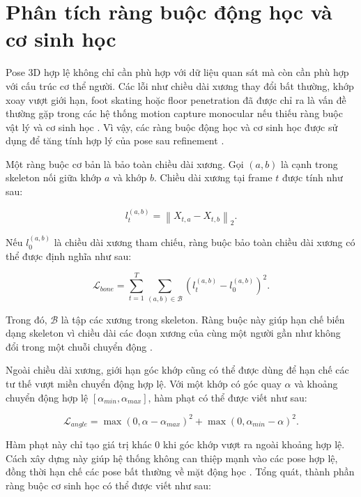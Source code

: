 \documentclass[../DoAn.tex]{subfiles}
\begin{document}
\section{Phân tích ràng buộc động học và cơ sinh học}

Pose 3D hợp lệ không chỉ cần phù hợp với dữ liệu quan sát mà còn cần phù hợp với cấu trúc cơ thể người. Các lỗi như chiều dài xương thay đổi bất thường, khớp xoay vượt giới hạn, foot skating hoặc floor penetration đã được chỉ ra là vấn đề thường gặp trong các hệ thống motion capture monocular nếu thiếu ràng buộc vật lý và cơ sinh học \cite{physcap2020}. Vì vậy, các ràng buộc động học và cơ sinh học được sử dụng để tăng tính hợp lý của pose sau refinement \cite{delp2007opensim,uhlrich2023opencap}.

Một ràng buộc cơ bản là bảo toàn chiều dài xương. Gọi $(a,b)$ là cạnh trong skeleton nối giữa khớp $a$ và khớp $b$. Chiều dài xương tại frame $t$ được tính như sau:

\begin{equation}
l_{t}^{(a,b)}
=
\left\|
X_{t,a} - X_{t,b}
\right\|_2.
\end{equation}

Nếu $l_{0}^{(a,b)}$ là chiều dài xương tham chiếu, ràng buộc bảo toàn chiều dài xương có thể được định nghĩa như sau:

\begin{equation}
\mathcal{L}_{bone}
=
\sum_{t=1}^{T}
\sum_{(a,b)\in\mathcal{B}}
\left(
l_{t}^{(a,b)}
-
l_{0}^{(a,b)}
\right)^2.
\end{equation}

Trong đó, $\mathcal{B}$ là tập các xương trong skeleton. Ràng buộc này giúp hạn chế biến dạng skeleton vì chiều dài các đoạn xương của cùng một người gần như không đổi trong một chuỗi chuyển động \cite{physcap2020,delp2007opensim}.

Ngoài chiều dài xương, giới hạn góc khớp cũng có thể được dùng để hạn chế các tư thế vượt miền chuyển động hợp lệ. Với một khớp có góc quay $\alpha$ và khoảng chuyển động hợp lệ $[\alpha_{min},\alpha_{max}]$, hàm phạt có thể được viết như sau:

\begin{equation}
\mathcal{L}_{angle}
=
\max(0, \alpha - \alpha_{max})^2
+
\max(0, \alpha_{min} - \alpha)^2.
\end{equation}

Hàm phạt này chỉ tạo giá trị khác $0$ khi góc khớp vượt ra ngoài khoảng hợp lệ. Cách xây dựng này giúp hệ thống không can thiệp mạnh vào các pose hợp lệ, đồng thời hạn chế các pose bất thường về mặt động học \cite{delp2007opensim,uhlrich2023opencap}. Tổng quát, thành phần ràng buộc cơ sinh học có thể được viết như sau:
\end{document}
